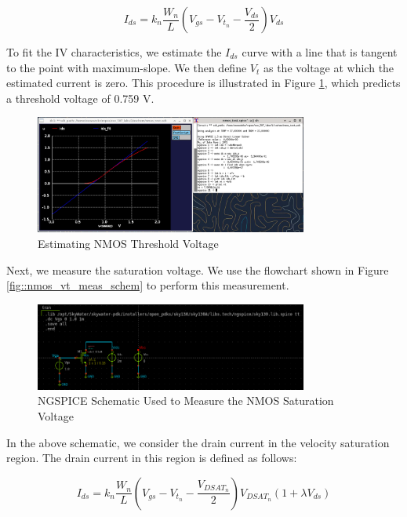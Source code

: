 \documentclass[fleqn]{article}
\begin{document}
	\begin{equation}
		I_{ds} = k_n\frac{W_n}{L}\left(V_{gs} - V_{t_n} - \frac{V_{ds}}{2}\right)V_{ds}
	\end{equation}
	
	\noindent To fit the IV characteristics, we estimate the $I_{ds}$ curve with a line that is tangent to the point with maximum-slope. We then define $V_t$ as the voltage at which the estimated current is zero. This procedure is illustrated in Figure \ref{fig::nmos_vt_meas}, which predicts a threshold voltage of 0.759 V.
	
	\begin{figure}[H]
		\centerline{\includegraphics[width=0.8\textwidth]{nmos_vt_meas.png}}
		\caption{Estimating NMOS Threshold Voltage}
		\label{fig::nmos_vt_meas}
	\end{figure}
	
	Next, we measure the saturation voltage. We use the flowchart shown in Figure \ref{fig::nmos_vt_meas_schem} to perform this measurement.
	
	\begin{figure}[H]
		\centerline{\includegraphics[width=0.8\textwidth]{nmos_vt_meas_schem.png}}
		\caption{NGSPICE Schematic Used to Measure the NMOS Saturation Voltage}
		\label{fig::nmos_vdsat_meas_schem}
	\end{figure}
	
	 \noindent In the above schematic, we consider the drain current in the velocity saturation region. The drain current in this region is defined as follows:
	
	\begin{equation}
		\label{eq::nmos_sat_current}
		I_{ds} = k_n\frac{W_n}{L}\left(V_{gs} - V_{t_n} - \frac{V_{DSAT_n}}{2}\right)V_{DSAT_n}(1 + {\lambda}V_{ds})
	\end{equation}
	
\end{document}
